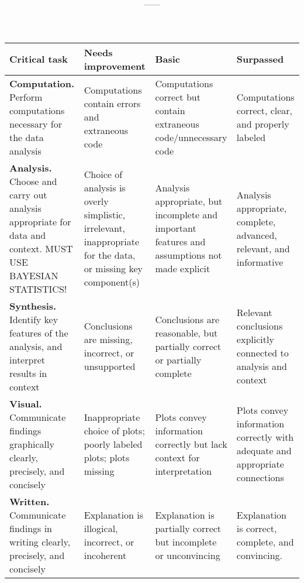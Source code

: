 \documentclass[11pt,onecolumn]{article}
\title{\textbf{\coursename}}
\author{{\semester}---{\roomnumb}---{\classtimes}}
\date{}
\makeatletter
\newcommand{\myname}{A.~Grant Schissler}
\newcommand{\myemail}{aschissler@unr.edu}
\newcommand{\office}{DMSC 224}
\newcommand{\officehours}{Tue 2:30pm-3:30pm, Wed 1:30pm-2:30pm, or by appointment}
\makeatother
\begin{document}
\maketitle

\vspace{-0.25in}
\noindent\makebox[\linewidth]{\rule{\textwidth}{1pt}}



\begin{table}[htb]
  \centering
  \begin{tabular}{|p{4.5cm}|p{3.5cm}|p{3.5cm}|p{3.5cm}|}
    \hline
    \bf Critical task & \bf Needs improvement & \bf Basic & \bf Surpassed \\
    \hline
    \hline
    \textbf{Computation.} Perform computations necessary for the data analysis & Computations contain errors and extraneous code & Computations correct but contain extraneous code/unnecessary code & Computations correct, clear, and properly labeled\\
    \hline
    \textbf{Analysis.} Choose and carry out analysis appropriate for data and context. MUST USE BAYESIAN STATISTICS! & Choice of analysis is overly simplistic, irrelevant, inappropriate for the data, or missing key component(s)& Analysis appropriate, but incomplete and important features and assumptions not made explicit & Analysis appropriate, complete, advanced, relevant, and informative\\
    \hline
    \textbf{Synthesis.} Identify key features of the analysis, and interpret results in context & Conclusions are missing, incorrect, or unsupported & Conclusions are reasonable, but partially correct or partially complete & Relevant conclusions explicitly connected to analysis and context\\
    \hline
    \textbf{Visual.} Communicate findings graphically clearly, precisely, and concisely & Inappropriate choice of plots; poorly labeled plots; plots missing & Plots convey information correctly but lack context for interpretation & Plots convey information correctly with adequate and appropriate connections\\
    \hline
    \textbf{Written.} Communicate findings in writing clearly, precisely, and concisely & Explanation is illogical, incorrect, or incoherent & Explanation is partially correct but incomplete or unconvincing & Explanation is correct, complete, and convincing.\\
    \hline
  \end{tabular}
\end{table}
\end{document}
